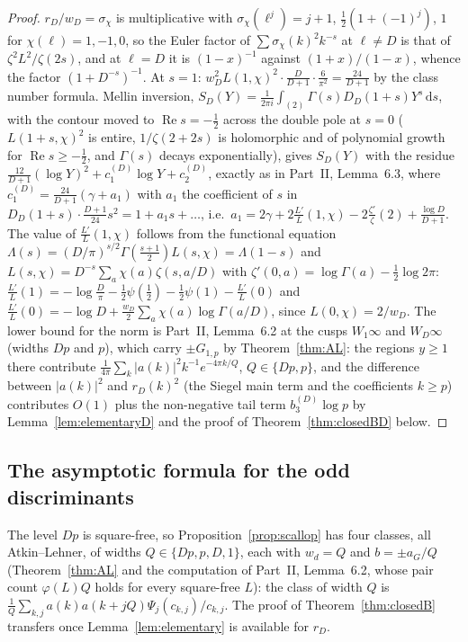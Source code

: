 \documentclass[11pt]{amsart}
\theoremstyle{remark}
\newcommand{\dd}{\mathrm{d}}
\begin{document}
\begin{proof}
$r_D/w_D=\sigma_\chi$ is multiplicative with $\sigma_\chi(\ell^j)=j+1$, $\frac12(1+(-1)^j)$, $1$ for $\chi(\ell)=1,-1,0$, so the Euler factor of $\sum\sigma_\chi(k)^2k^{-s}$ at $\ell\ne D$ is that of $\zeta^2L^2/\zeta(2s)$, and at $\ell=D$ it is $(1-x)^{-1}$ against $(1+x)/(1-x)$, whence the factor $(1+D^{-s})^{-1}$. At $s=1$: $w_D^2L(1,\chi)^2\cdot\frac D{D+1}\cdot\frac6{\pi^2}=\frac{24}{D+1}$ by the class number formula. Mellin inversion, $S_D(Y)=\frac1{2\pi i}\int_{(2)}\Gamma(s)D_D(1+s)Y^s\,\dd s$, with the contour moved to $\operatorname{Re}s=-\frac12$ across the double pole at $s=0$ ($L(1+s,\chi)^2$ is entire, $1/\zeta(2+2s)$ is holomorphic and of polynomial growth for $\operatorname{Re}s\ge-\frac12$, and $\Gamma(s)$ decays exponentially), gives $S_D(Y)$ with the residue $\frac{12}{D+1}(\log Y)^2+c_1^{(D)}\log Y+c_2^{(D)}$, exactly as in Part~II, Lemma~6.3, where $c_1^{(D)}=\frac{24}{D+1}(\gamma+a_1)$ with $a_1$ the coefficient of $s$ in $D_D(1+s)\cdot\frac{D+1}{24}s^2=1+a_1s+\dots$, i.e.\ $a_1=2\gamma+2\frac{L'}L(1,\chi)-2\frac{\zeta'}\zeta(2)+\frac{\log D}{D+1}$. The value of $\frac{L'}L(1,\chi)$ follows from the functional equation $\Lambda(s)=(D/\pi)^{s/2}\Gamma(\frac{s+1}2)L(s,\chi)=\Lambda(1-s)$ and $L(s,\chi)=D^{-s}\sum_a\chi(a)\zeta(s,a/D)$ with $\zeta'(0,a)=\log\Gamma(a)-\frac12\log2\pi$: $\frac{L'}L(1)=-\log\frac D\pi-\frac12\psi(\frac12)-\frac12\psi(1)-\frac{L'}L(0)$ and $\frac{L'}L(0)=-\log D+\frac{w_D}2\sum_a\chi(a)\log\Gamma(a/D)$, since $L(0,\chi)=2/w_D$. The lower bound for the norm is Part~II, Lemma~6.2 at the cusps $W_1\infty$ and $W_D\infty$ (widths $Dp$ and $p$), which carry $\pm G_{1,p}$ by Theorem~\ref{thm:AL}: the regions $y\ge1$ there contribute $\frac1{4\pi}\sum_k|a(k)|^2k^{-1}e^{-4\pi k/Q}$, $Q\in\{Dp,p\}$, and the difference between $|a(k)|^2$ and $r_D(k)^2$ (the Siegel main term and the coefficients $k\ge p$) contributes $O(1)$ plus the non-negative tail term $b_3^{(D)}\log p$ by Lemma~\ref{lem:elementaryD} and the proof of Theorem~\ref{thm:closedBD} below.
\end{proof}

\subsection{The asymptotic formula for the odd discriminants}\label{subsec:oddasymp}
The level $Dp$ is square-free, so Proposition~\ref{prop:scallop} has four classes, all Atkin--Lehner, of widths $Q\in\{Dp,p,D,1\}$, each with $w_d=Q$ and $b=\pm a_G/Q$ (Theorem~\ref{thm:AL} and the computation of Part~II, Lemma~6.2, whose pair count $\varphi(L)Q$ holds for every square-free $L$): the class of width $Q$ is $\frac1Q\sum_{k,j}a(k)a(k+jQ)\Psi_j(c_{k,j})/c_{k,j}$. The proof of Theorem~\ref{thm:closedB} transfers once Lemma~\ref{lem:elementary} is available for $r_D$.
\end{document}
